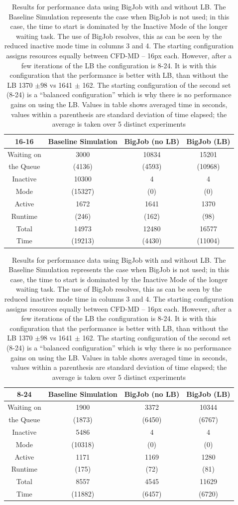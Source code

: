 \documentclass[conference,final]{IEEEtran}
\begin{document}
\setlength{\tabcolsep}{1pt}
\begin{table}[!ht]
\begin{center}

\caption{\small Results for performance data using BigJob with and without LB. The Baseline Simulation represents the case when BigJob is not used; in this case, the time to start is dominated by the Inactive Mode of the longer waiting task. The use of BigJob resolves, this as can be seen by the reduced inactive mode time in columns 3 and 4. The starting configuration assigns resources equally between CFD-MD -- 16px each. However, after a few iterations of the LB the configuration is 8-24. It is with this configuration that the performance is better with LB, than without the LB 1370 $\pm 98$ vs 1641 $\pm$ 162. The starting configuration of the second set (8-24) is a ``balanced configuration'' which is why there is no performance gains on using the LB. Values in table shows averaged time in seconds, values within a parenthesis are standard deviation of time elapsed; the average is taken over 5 distinct experiments}
\label{table:oneBJ_Test}

\begin{tabular}{ c|| c | c | c }

\hline
16-16 & Baseline Simulation & BigJob (no LB) & BigJob (LB) \\
\hline
\hline
Waiting on & 3000     & 10834  & 15201  \\
the Queue  & (4136)   & (4593) & (10968) \\
\hline
Inactive   & 10300    & 4      & 4  \\
Mode       & (15327)  & (0)    & (0) \\
\hline
Active     & 1672     & 1641   & 1370 \\
Runtime    & (246)    & (162)  & (98) \\
\hline
Total      & 14973    & 12480  & 16577 \\
Time       & (19213)  & (4430) & (11004) \\
\hline

\end{tabular}

\begin{tabular}{ c|| c | c | c }
\hline
8-24 & Baseline Simulation & BigJob (no LB) & BigJob (LB) \\
\hline
\hline
Waiting on & 1900 & 3372 & 10344  \\
the Queue & (1873) & (6450) & (6767) \\
\hline
Inactive & 5486 & 4 & 4 \\
Mode & (10318) & (0) & (0) \\
\hline
Active & 1171 & 1169 & 1280 \\
Runtime & (175) & (72) & (81) \\
\hline
Total & 8557 & 4545 & 11629 \\
Time & (11882) & (6457) & (6720) \\
\hline
\end{tabular}
\end{center}
\end{table}
\end{document}
